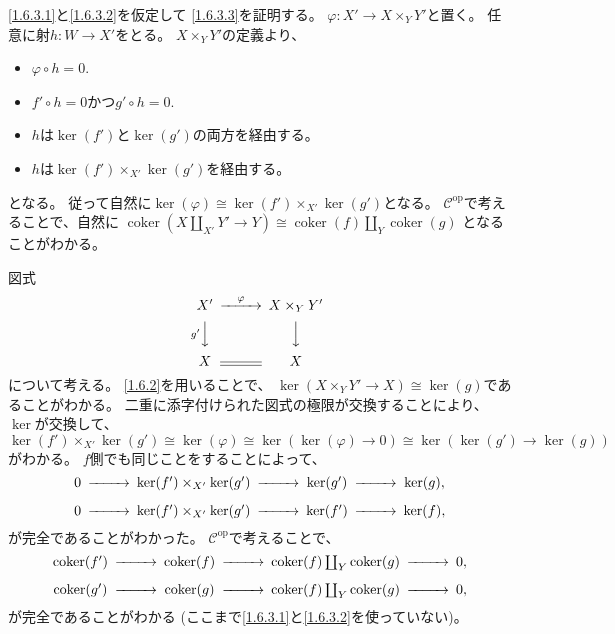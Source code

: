 \documentclass[uplatex,dvipdfmx]{jsarticle}
\makeatletter
\theoremstyle{definition}
\renewenvironment{proof}[1][\proofname]{
  \pushQED{\qed}%
  \normalfont \topsep6\p@\@plus6\p@\relax
  \trivlist
  \item[\hskip\labelsep
    #1\@addpunct{\textbf{.}}]\ignorespaces
}{%
  \popQED\endtrivlist\@endpefalse
}
\providecommand{\proofname}{証明}
\newcommand{\op}{\mathrm{op}}
\DeclareMathOperator{\coker}{\mathrm{coker}}
\newcommand\mcC{\mathcal{C}}
\makeatother
\begin{document}
\begin{proof}
  \ref{1.6.3.1}と\ref{1.6.3.2}を仮定して
  \ref{1.6.3.3}を証明する。
  \(\varphi:X'\to X\times_YY'\)と置く。
  任意に射\(h:W\to X'\)をとる。
  \(X\times_YY'\)の定義より、
  \begin{itemize}
    \item[ \ ]
    \(\varphi\circ h = 0\).
    \item[\(\Leftrightarrow\)]
    \(f'\circ h = 0\)かつ\(g'\circ h = 0\).
    \item[\(\Leftrightarrow\)]
    \(h\)は\(\ker(f')\)と\(\ker(g')\)の両方を経由する。
    \item[\(\Leftrightarrow\)]
    \(h\)は\(\ker(f')\times_{X'}\ker(g')\)を経由する。
  \end{itemize}
  となる。
  従って自然に\(\ker(\varphi) \cong \ker(f')\times_{X'}\ker(g')\)となる。
  \(\mcC^{\op}\)で考えることで、自然に
  \(\coker(X\coprod_{X'}Y'\to Y)\cong \coker(f)\coprod_Y\coker(g)\)
  となることがわかる。

  図式
  \[
  \begin{CD}
    X' @> \varphi >> X\times_Y Y' \\
    @V g' VV @VVV \\
    X @= X
  \end{CD}
  \]
  について考える。
  \ref{1.6.2}を用いることで、
  \(\ker(X\times_YY'\to X) \cong \ker(g)\)であることがわかる。
  二重に添字付けられた図式の極限が交換することにより、
  \(\ker\)が交換して、
  \[
  \ker(f')\times_{X'}\ker(g')\cong \ker(\varphi)
  \cong \ker(\ker(\varphi)\to 0) \cong \ker(\ker(g')\to \ker(g))
  \]
  がわかる。
  \(f\)側でも同じことをすることによって、
  \[
  \begin{CD}
    0 @>>> \ker(f')\times_{X'}\ker(g') @>>> \ker(g') @>>> \ker(g),  \\
    0 @>>> \ker(f')\times_{X'}\ker(g') @>>> \ker(f') @>>> \ker(f),
  \end{CD}
  \]
  が完全であることがわかった。
  \(\mcC^{\op}\)で考えることで、
  \[
  \begin{CD}
    \coker(f') @>>> \coker(f) @>>> \coker(f)\coprod_Y\coker(g) @>>> 0, \\
    \coker(g') @>>> \coker(g) @>>> \coker(f)\coprod_Y\coker(g) @>>> 0,
  \end{CD}
  \]
  が完全であることがわかる
  (ここまで\ref{1.6.3.1}と\ref{1.6.3.2}を使っていない)。


\end{proof}
\end{document}
